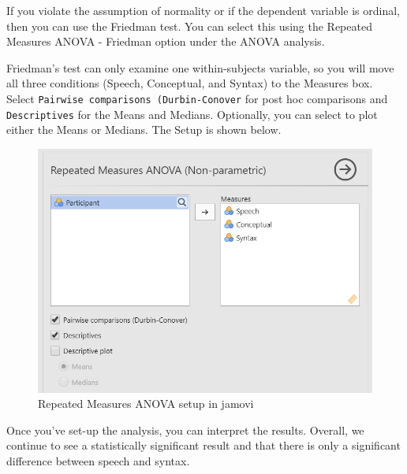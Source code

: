 \documentclass[
]{book}
\begin{document}
If you violate the assumption of normality or if the dependent variable is ordinal, then you can use the Friedman test. You can select this using the Repeated Measures ANOVA - Friedman option under the ANOVA analysis.

Friedman's test can only examine one within-subjects variable, so you will move all three conditions (Speech, Conceptual, and Syntax) to the Measures box. Select \texttt{Pairwise\ comparisons\ (Durbin-Conover} for post hoc comparisons and \texttt{Descriptives} for the Means and Medians. Optionally, you can select to plot either the Means or Medians. The Setup is shown below.

\begin{figure}

{\centering \includegraphics[width=0.8\linewidth]{images/05-repeated-measures-anova/rm-anova_friedman_setup} 

}

\caption{Repeated Measures ANOVA setup in jamovi}\label{fig:unnamed-chunk-9}
\end{figure}

Once you've set-up the analysis, you can interpret the results. Overall, we continue to see a statistically significant result and that there is only a significant difference between speech and syntax.
\end{document}
